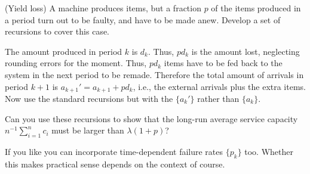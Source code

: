 \begin{question}
  (Yield loss) A machine produces items, but a fraction $p$ of the
  items produced in a period turn out to be faulty, and have to be
  made anew. Develop a set of recursions to cover this case.
  \begin{solution}
    The amount produced in period $k$ is $d_k$. Thus, $p d_k$ is the
    amount lost, neglecting rounding errors for the moment. Thus,
    $p d_k$ items have to be fed back to the system in the next period
    to be remade. Therefore the total amount of arrivals in period
    $k+1$ is $a_{k+1}'=a_{k+1}+pd_k$, i.e., the external arrivals plus
    the extra items. Now use the standard recursions but with the
    $\{a_{k}'\}$ rather than $\{a_k\}$.

    Can you use these recursions to show that the long-run average
    service capacity $n^{-1}\sum_{i=1}^n c_i$ must be larger than
    $\lambda(1+p)$?

    If you like you can incorporate time-dependent failure rates
    $\{p_k\}$ too. Whether this makes practical sense depends on the
    context of course.
      \end{solution}
\end{question}


